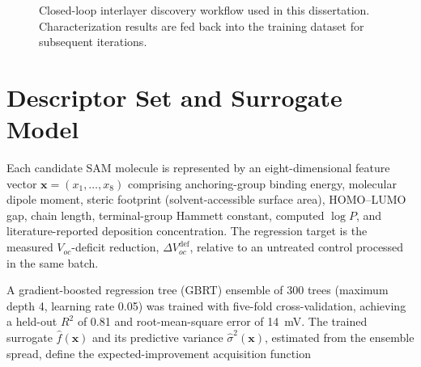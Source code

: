 \documentclass[12pt,a4paper,oneside]{report}
\begin{document}
\begin{figure}[htbp]
\centering
{}
\caption{Closed-loop interlayer discovery workflow used in this
dissertation. Characterization results are fed back into the training
dataset for subsequent iterations.}
\label{fig:workflow}
\end{figure}

\section{Descriptor Set and Surrogate Model}

Each candidate SAM molecule is represented by an eight-dimensional feature
vector $\mathbf{x} = (x_1,\ldots,x_8)$ comprising anchoring-group binding
energy, molecular dipole moment, steric footprint (solvent-accessible
surface area), HOMO--LUMO gap, chain length, terminal-group Hammett
constant, computed $\log P$, and literature-reported deposition
concentration. The regression target is the measured $V_{oc}$-deficit
reduction, $\Delta V_{oc}^{\text{def}}$, relative to an untreated control
processed in the same batch.

A gradient-boosted regression tree (GBRT) ensemble of 300 trees (maximum
depth 4, learning rate 0.05) was trained with five-fold cross-validation,
achieving a held-out $R^2$ of 0.81 and root-mean-square error of 14~mV.
The trained surrogate $\hat{f}(\mathbf{x})$ and its predictive variance
$\hat{\sigma}^2(\mathbf{x})$, estimated from the ensemble spread, define
the expected-improvement acquisition function
\end{document}
